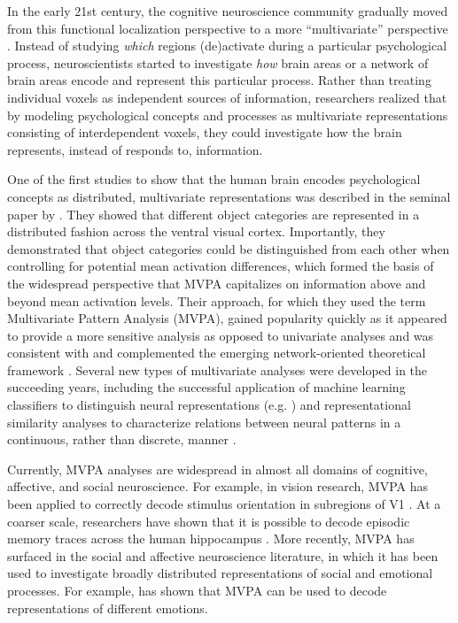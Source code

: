 \documentclass[jou,12pt,a4paper]{apa6}
\begin{document}
In the early 21st century, the cognitive neuroscience community gradually moved from this functional localization perspective to a more ``multivariate'' perspective \cite{sporns2002,barrett2013}. Instead of studying \emph{which} regions (de)activate during a particular psychological process, neuroscientists started to investigate \emph{how} brain areas or a network of brain areas encode and represent this particular process. Rather than treating individual voxels as independent sources of information, researchers realized that by modeling psychological concepts and processes as multivariate representations consisting of interdependent voxels, they could investigate how the brain represents, instead of responds to, information.

One of the first studies to show that the human brain encodes psychological concepts as distributed, multivariate representations was described in the seminal paper by \cite{haxby2001}. They showed that different object categories are represented in a distributed fashion across the ventral visual cortex. Importantly, they demonstrated that object categories could be distinguished from each other when controlling for potential mean activation differences, which formed the basis of the widespread perspective that MVPA capitalizes on information above and beyond mean activation levels. Their approach, for which they used the term Multivariate Pattern Analysis (MVPA), gained popularity quickly as it appeared to provide a more sensitive analysis as opposed to univariate analyses \cite{jimura2012} and was consistent with and complemented the emerging network-oriented theoretical framework \cite{bressler2010}. Several new types of multivariate analyses were developed in the succeeding years, including the successful application of machine learning classifiers to distinguish neural representations (e.g. ) and representational similarity analyses to characterize relations between neural patterns in a continuous, rather than discrete, manner \cite{kriegeskorte2008}. 

Currently, MVPA analyses are widespread in almost all domains of cognitive, affective, and social neuroscience. For example, in vision research, MVPA has been applied to correctly decode stimulus orientation in subregions of V1 \cite{kamitani2005}. At a coarser scale, researchers have shown that it is possible to decode episodic memory traces across the human hippocampus \cite{chadwick2010}. More recently, MVPA has surfaced in the social and affective neuroscience literature, in which it has been used to investigate broadly distributed representations of social and emotional processes. For example,  has shown that MVPA can be used to decode representations of different emotions. 
\end{document}
